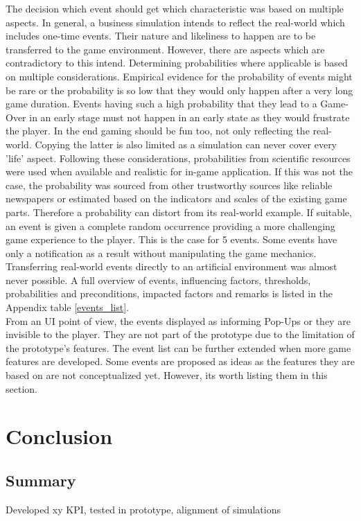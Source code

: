 \documentclass[11pt,titlepage,oneside,openany]{book}
\begin{document}
The decision which event should get which characteristic was based on multiple aspects. In general, a business simulation intends to reflect the real-world which includes one-time events. Their nature and likeliness to happen are to be transferred to the game environment. However, there are aspects which are contradictory to this intend.
Determining probabilities where applicable is based on multiple considerations. Empirical evidence for the probability of events might be rare or the probability is so low that they would only happen after a very long game duration. Events having such a high probability that they lead to a Game-Over in an early stage must not happen in an early state as they would frustrate the player. In the end gaming should be fun too, not only reflecting the real-world. Copying the latter is also limited as a simulation can never cover every 'life' aspect.  Following these considerations, probabilities from scientific resources were used when available and realistic for in-game application. If this was not the case, the probability was sourced from other trustworthy sources like reliable newspapers or estimated based on the indicators and scales of the existing game parts. Therefore a probability can distort from its real-world example. If suitable, an event is given a complete random occurrence providing a more challenging game experience to the player. This is the case for 5 events. Some events have only a notification as a result without manipulating the game mechanics. Transferring real-world events directly to an artificial environment was almost never possible. A full overview of events, influencing factors, thresholds, probabilities and preconditions, impacted factors and remarks is listed in the Appendix table \ref{events_list}. \\
From an UI point of view, the events displayed as informing Pop-Ups or they are invisible to the player. They are not part of the prototype due to the limitation of the prototype's features. The event list can be further extended when more game features are developed. Some events are proposed as ideas as the features they are based on are not conceptualized yet. However, its worth listing them in this section. 




\chapter{Conclusion}

\section{Summary}
Developed xy KPI, tested in prototype, alignment of simulations
\end{document}
